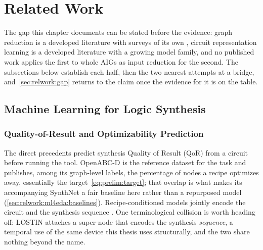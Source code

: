 \section{Related Work}
\label{sec:relwork}
The gap this chapter documents can be stated before the evidence: graph reduction is a
developed literature with surveys of its own
\citep{hashemi2024survey,shabani2023summarization}, circuit representation learning is a
developed literature with a growing model family, and no published work applies the first
to whole AIGs as input reduction for the second. The subsections below establish each
half, then the two nearest attempts at a bridge, and~\ref{sec:relwork:gap} returns to the
claim once the evidence for it is on the table.

\subsection{Machine Learning for Logic Synthesis}
\label{sec:relwork:ml4eda}


\subsubsection{Quality-of-Result and Optimizability Prediction}
\label{sec:relwork:ml4eda:qor}
The direct precedents predict synthesis Quality of Result (QoR) from a circuit before
running the tool. OpenABC-D \citep{chowdhury2021openabc} is the reference dataset for the
task and publishes, among its graph-level labels, the percentage of nodes a recipe
optimizes away, essentially the target~\eqref{eq:prelim:target}; that overlap is what
makes its accompanying SynthNet a fair baseline here rather than a repurposed model
(\ref{sec:relwork:ml4eda:baselines}). Recipe-conditioned models jointly encode the
circuit and the synthesis sequence \citep{qor_transformer2022,wu2022lostin}. One
terminological collision is worth heading off: LOSTIN \citep{wu2022lostin} attaches a
super-node that encodes the synthesis \emph{sequence}, a temporal use of the same device
this thesis uses structurally, and the two share nothing beyond the name.


